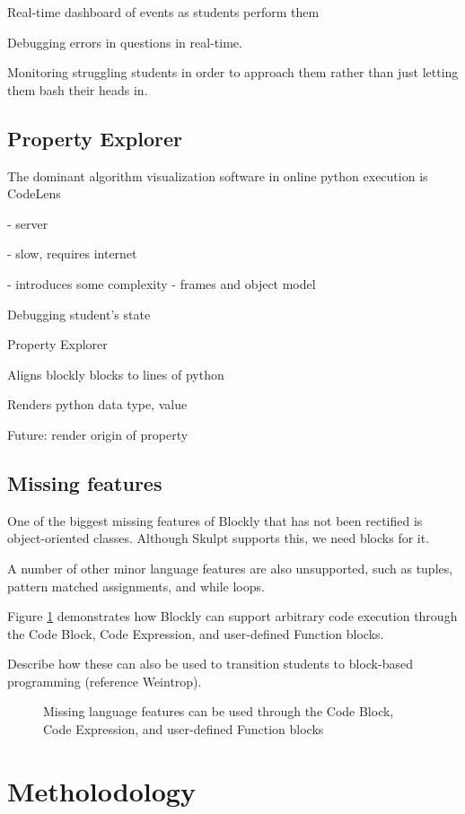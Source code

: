 \documentclass{sig-alternate}
\begin{document}
Real-time dashboard of events as students perform them

Debugging errors in questions in real-time.

Monitoring struggling students in order to approach them rather than just letting them bash their heads in.
	
\subsection{Property Explorer}

The dominant algorithm visualization software in online python execution is CodeLens

- server

- slow, requires internet

- introduces some complexity - frames and object model

Debugging student's state

Property Explorer

	Aligns blockly blocks to lines of python
	
	Renders python data type, value
	
	Future: render origin of property


\subsection{Missing features}

One of the biggest missing features of Blockly that has not been rectified is object-oriented classes. Although Skulpt supports this, we need blocks for it.

A number of other minor language features are also unsupported, such as tuples, pattern matched assignments, and while loops.

Figure \ref{fig-blockly-custom} demonstrates how Blockly can support arbitrary code execution through the Code Block, Code Expression, and user-defined Function blocks.

Describe how these can also be used to transition students to block-based programming (reference Weintrop).

\begin{figure}
\label{fig-blockly-custom}
\caption{Missing language features can be used through the Code Block, Code Expression, and user-defined Function blocks}
\end{figure}


\section{Metholodology}
\end{document}
